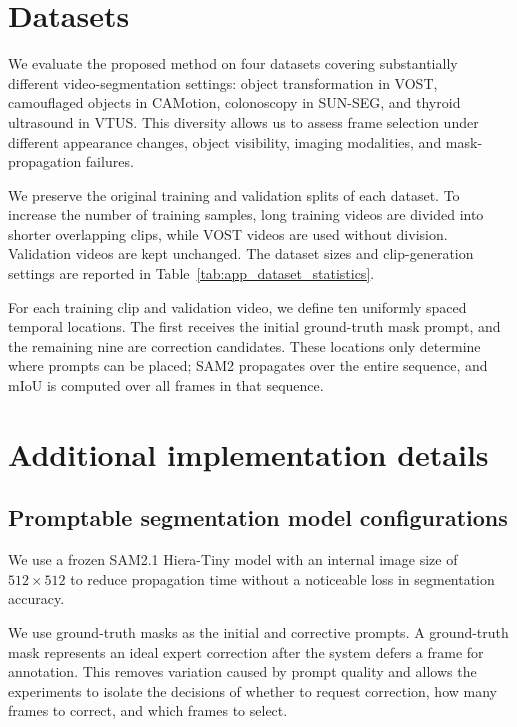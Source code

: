 \clearpage
\appendix
\maketitlesupplementary

\section{Datasets}
\label{app:dataset_details}
We evaluate the proposed method on four datasets covering substantially
different video-segmentation settings: object transformation in VOST,
camouflaged objects in CAMotion, colonoscopy in SUN-SEG, and thyroid
ultrasound in VTUS.
This diversity allows us to assess frame selection
under different appearance changes, object visibility, imaging
modalities, and mask-propagation failures.

We preserve the original training and validation splits of each dataset.
To increase the number of training samples, long training videos are
divided into shorter overlapping clips, while VOST videos are used
without division. Validation videos are kept unchanged. The dataset sizes
and clip-generation settings are reported in
Table~\ref{tab:app_dataset_statistics}.



For each training clip and validation video, we define ten uniformly
spaced temporal locations. The first receives the initial ground-truth
mask prompt, and the remaining nine are correction candidates. These
locations only determine where prompts can be placed; SAM2 propagates
over the entire sequence, and mIoU is computed over all frames in that
sequence.

\section{Additional implementation details}

\subsection{Promptable segmentation model configurations}

We use a frozen SAM2.1 Hiera-Tiny model with an internal image size of
\(512\times512\) to reduce propagation time without a noticeable loss in
segmentation accuracy.

We use ground-truth masks as the initial and corrective prompts. A
ground-truth mask represents an ideal expert correction after the system
defers a frame for annotation. This removes variation caused by prompt
quality and allows the experiments to isolate the decisions of whether
to request correction, how many frames to correct, and which frames to
select.

